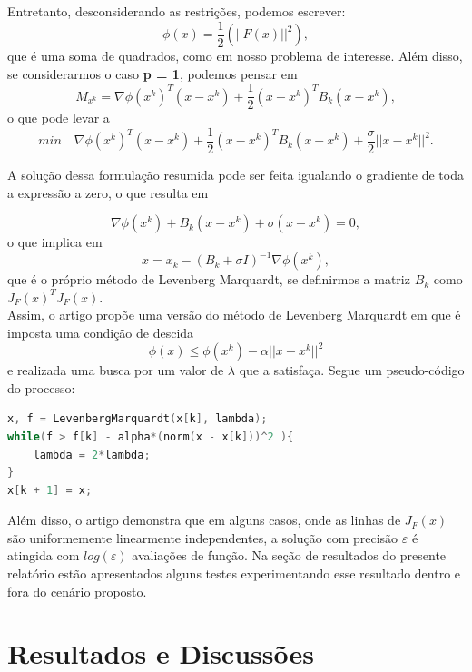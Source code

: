 \documentclass[11pt]{article}
\begin{document}
\noindent
Entretanto, desconsiderando as restrições, podemos escrever:
$$\phi (x) = \frac{1}{2}(||F(x)||^2),$$ que é uma soma de quadrados, como em nosso problema de interesse. Além disso, se considerarmos o caso \textbf{p = 1}, podemos pensar em $$M_{x^k} = \nabla \phi(x^k)^T (x - x^k) + \frac{1}{2}(x - x^k)^T B_k (x - x^k),$$ o que pode levar a
$$min \quad \nabla \phi(x^k)^T (x - x^k) + \frac{1}{2}(x - x^k)^T B_k (x - x^k) + \frac{\sigma}{2} ||x - x^k||^2.$$


\noindent
A solução dessa formulação resumida pode ser feita igualando o gradiente de toda a expressão a zero, o que resulta em 

$$\nabla \phi(x^k) + B_k (x - x^k) + \sigma(x - x^k) = 0, $$ 
o que implica em 
$$x = x_k - (B_k + \sigma I)^{-1} \nabla \phi(x^k), $$ que é o próprio método de Levenberg Marquardt, se definirmos a matriz $B_k$ como $J_{F}(x)^T J_{F}(x)$.\\ 


\noindent
Assim, o artigo propõe uma versão do método de Levenberg Marquardt em que é imposta uma condição de descida
$$\phi(x) \leq \phi(x^k) - \alpha ||x - x^k||^2$$ e realizada uma busca por um valor de $\lambda$ que a satisfaça. Segue um pseudo-código do processo:

\begin{lstlisting}[language=C, caption=Levenberg Marquardt com busca linear]
x, f = LevenbergMarquardt(x[k], lambda);
while(f > f[k] - alpha*(norm(x - x[k]))^2 ){
	lambda = 2*lambda;
}
x[k + 1] = x;
\end{lstlisting}


\noindent
Além disso, o artigo demonstra\cite{bmLS} que em alguns casos, onde as linhas de $J_F(x)$ são uniformemente linearmente independentes, a solução com precisão $\varepsilon$ é atingida com $log (\varepsilon)$ avaliações de função. Na seção de resultados do presente relatório estão apresentados alguns testes experimentando esse resultado dentro e fora do cenário proposto.
\newpage
\section{Resultados e Discussões}
\end{document}
